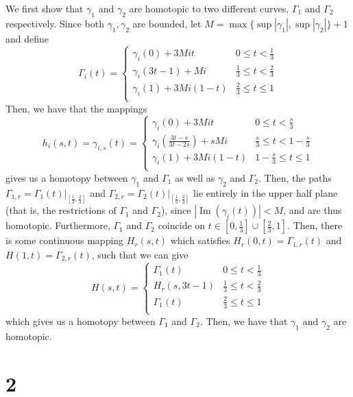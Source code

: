 \documentclass[12pt,letterpaper]{article}
\theoremstyle{definition}
\DeclareMathOperator{\imag}{Im}
\begin{document}
We first show that $\gamma_{1}$ and $\gamma_{2}$ are homotopic to two different curves, $\Gamma_{1}$ and $\Gamma_{2}$ respectively. Since both $\gamma_{1}, \gamma_{2}$ are bounded, let $M = \max\{\sup|\gamma_{1}|, \sup|\gamma_{2}|\} + 1$ and define
\[
  \Gamma_{i}(t) = \begin{cases}
    \gamma_{i}(0) + 3Mit & 0 \leq t < \frac{1}{3} \\
    \gamma_{i}(3t - 1) + Mi & \frac{1}{3} \leq t < \frac{2}{3} \\
    \gamma_{i}(1) + 3Mi(1-t) & \frac{2}{3} \leq t \leq 1 \\
  \end{cases}
\]
Then, we have that the mappings
\[
  h_{i}(s, t) = \gamma_{i,s}(t) = \begin{cases}
    \gamma_{i}(0) + 3Mit & 0 \leq t < \frac{s}{3} \\
    \gamma_{i}\left(\frac{3t-s}{3t-2s}\right) + sMi & \frac{s}{3} \leq t < 1 - \frac{s}{3} \\
    \gamma_{i}(1) + 3Mi(1 - t) & 1 - \frac{s}{3} \leq t \leq 1 \\
  \end{cases}
\]
gives us a homotopy between $\gamma_{1}$ and $\Gamma_{1}$ as well as $\gamma_{2}$ and $\Gamma_{2}$. Then, the paths $\Gamma_{1,r} = \Gamma_{1}(t)|_{[\frac{1}{3},\frac{2}{3}]}$ and $\Gamma_{2,r} = \Gamma_{2}(t)|_{[\frac{1}{3},\frac{2}{3}]}$ lie entirely in the upper half plane (that is, the restrictions of $\Gamma_{1}$ and $\Gamma_{2}$), since $|\imag(\gamma_{i}(t))| < M$, and are thus homotopic. Furthermore, $\Gamma_{1}$ and $\Gamma_{2}$ coincide on $t \in [0, \frac{1}{3}] \cup [\frac{2}{3}, 1]$. Then, there is some continuous mapping $H_{r}(s,t)$ which satisfies $H_{r}(0, t) = \Gamma_{1,r}(t)$ and $H(1, t) = \Gamma_{2,r}(t)$, such that we can give
\[
  H(s,t) = \begin{cases}
    \Gamma_{1}(t) & 0 \leq t < \frac{1}{3} \\
    H_{r}(s, 3t - 1) & \frac{1}{3} \leq t < \frac{2}{3} \\
    \Gamma_{1}(t) & \frac{2}{3} \leq t \leq 1 \\
  \end{cases}
\]
which gives us a homotopy between $\Gamma_{1}$ and $\Gamma_{2}$. Then, we have that $\gamma_{1}$ and $\gamma_{2}$ are homotopic.

\section*{2}
\end{document}
